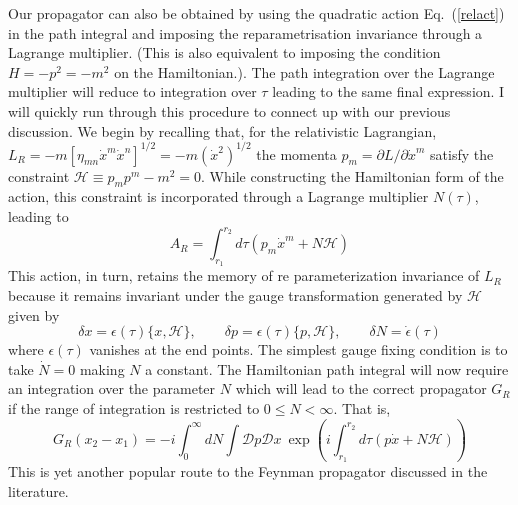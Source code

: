 \documentclass[12pt]{article}
\def\eq#1{{Eq.~(\ref{#1})}}
\begin{document}
Our propagator can also be obtained by using the quadratic action  \eq{relact} in the path integral and imposing the reparametrisation invariance through a Lagrange multiplier. (This is also equivalent to imposing the condition $H=-p^2=-m^2$ on the Hamiltonian.). The path integration over the Lagrange multiplier will reduce to integration over $\tau$ leading to the same final expression.
I will quickly run through this procedure \cite{C1,C2a,C2b} to connect up with our previous discussion. 
  We begin by recalling that, for the relativistic Lagrangian,
 $
 L_R = - m \left[ \eta_{mn} \dot x^m \dot x^n\right]^{1/2} = - m(\dot x^2)^{1/2}
 $ 
 the momenta $p_m = \partial L/\partial \dot x^m$ satisfy the constraint $\mathcal{H} \equiv p_m p^m - m^2 = 0$. While constructing the Hamiltonian form of the action, this constraint is incorporated through a Lagrange multiplier $N(\tau)$, leading to  
 \begin{equation}
 A_R = \int_{r_1}^{r_2} d\tau \left( p_m \dot x^m + N \mathcal{H}\right)
 \end{equation} 
 This action, in turn, retains the memory of re parameterization invariance of $L_R$ because it remains invariant under the gauge transformation generated by $\mathcal{H}$ given by 
 \begin{equation}
 \delta x = \epsilon(\tau) \{ x, \mathcal{H}\}, \qquad \delta p = \epsilon(\tau) \{ p , \mathcal{H}\}, \qquad \delta N = \dot \epsilon(\tau)
 \end{equation} 
 where $\epsilon(\tau)$ vanishes at the end points. The simplest gauge fixing condition \cite{3ofa} is to take $\dot N =0$ making $N$ a constant. The Hamiltonian path integral will now require an integration over the parameter $N$ which will lead to the correct propagator $G_R$ if the range of integration is restricted to $0\le N< \infty$. That is, 
 \begin{equation}
 G_R(x_2-x_1) = - i \int_0^\infty  dN\int \mathcal{D}p \mathcal{D}x \ \exp \left( i \int_{r_1}^{r_2} d\tau \left( p \dot x + N \mathcal{H}\right)\right)
 \end{equation} 
This is yet another popular route to the Feynman propagator discussed in the literature. 
\end{document}
